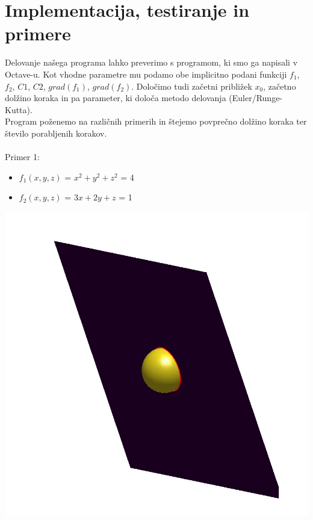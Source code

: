 \documentclass[]{article}
\begin{document}
\section{Implementacija, testiranje in primere}
	Delovanje našega programa lahko preverimo s programom, ki smo ga napisali v Octave-u. Kot vhodne parametre mu podamo obe implicitno podani funkciji $f_{1}$, $f_{2}$, $C1$, $C2$, $grad(f_{1})$, $grad(f_{2})$. Določimo tudi začetni približek $x_{0}$, začetno dolžino koraka in pa parameter, ki določa metodo delovanja (Euler/Runge-Kutta).\\
	Program poženemo na različnih primerih in štejemo povprečno dolžino koraka ter število porabljenih korakov.\\\\
	Primer 1:
	\begin{itemize} 
		\item $f_{1}(x,y,z)$ = $x^2 + y^2 + z^2$ = 4
		\item $f_{2}(x,y,z)$ = $3x + 2y + z$ = 1	
	\end{itemize}
	\includegraphics[scale=0.3]{primer1_1}
\end{document}
